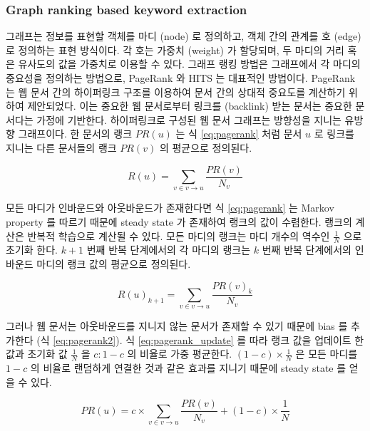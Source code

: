 \documentclass[11pt]{article}
\begin{document}
\subsubsection{Graph ranking based keyword extraction}

그래프는 정보를 표현할 객체를 마디 (node) 로 정의하고, 객체 간의 관계를 호 (edge) 로 정의하는 표현 방식이다.
각 호는 가중치 (weight) 가 할당되며, 두 마디의 거리 혹은 유사도의 값을 가중치로 이용할 수 있다.
그래프 랭킹 방법은 그래프에서 각 마디의 중요성을 정의하는 방법으로, PageRank \citep{ilprints422}와 HITS \citep{kleinberg1999authoritative} 는 대표적인 방법이다.
PageRank 는 웹 문서 간의 하이퍼링크 구조를 이용하여 문서 간의 상대적 중요도를 계산하기 위하여 제안되었다.
이는 중요한 웹 문서로부터 링크를 (backlink) 받는 문서는 중요한 문서다는 가정에 기반한다.
하이퍼링크로 구성된 웹 문서 그래프는 방향성을 지니는 유방향 그래프이다.
한 문서의 랭크 $PR(u)$ 는 식 \ref{eq:pagerank} 처럼 문서 $u$ 로 링크를 지니는 다른 문서들의 랭크 $PR(v)$ 의 평균으로 정의된다.

\begin{equation}
  \label{eq:pagerank}
  R(u) = \sum_{v \in v \rightarrow u} \frac{PR(v)}{N_v}
\end{equation}

모든 마디가 인바운드와 아웃바운드가 존재한다면 식 \ref{eq:pagerank} 는 Markov property 를 따르기 때문에 steady state 가 존재하여 랭크의 값이 수렴한다.
랭크의 계산은 반복적 학습으로 계산될 수 있다.
모든 마디의 랭크는 마디 개수의 역수인 $\frac{1}{N}$ 으로 초기화 한다.
$k+1$ 번째 반복 단계에서의 각 마디의 랭크는 $k$ 번째 반복 단계에서의 인바운드 마디의 랭크 값의 평균으로 정의된다.

\begin{equation}
  \label{eq:pagerank_update}
  R(u)_{k+1} = \sum_{v \in v \rightarrow u} \frac{PR(v)_k}{N_v}
\end{equation}

그러나 웹 문서는 아웃바운드를 지니지 않는 문서가 존재할 수 있기 때문에 bias 를 추가한다 (식 \ref{eq:pagerank2}).
식 \ref{eq:pagerank_update} 를 따라 랭크 값을 업데이트 한 값과 초기화 값 $\frac{1}{N}$ 을 $c : 1-c$ 의 비율로 가중 평균한다.
$(1-c) \times \frac{1}{N}$ 은 모든 마디를 $1-c$ 의 비율로 랜덤하게 연결한 것과 같은 효과를 지니기 때문에 steady state 를 얻을 수 있다.

\begin{equation}
  \label{eq:pagerank2}
  PR(u) = c \times \sum_{v \in v \rightarrow u} \frac{PR(v)}{N_v} + (1-c) \times \frac{1}{N}
\end{equation}
\end{document}
